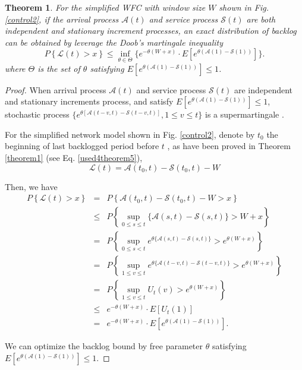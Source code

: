 \documentclass[12pt]{article}
\newtheorem{theorem}{Theorem}
\newtheorem{proof}{Proof}
\begin{document}
\begin{theorem}\label{theorem3}
For the simplified WFC with window size $W$ shown in Fig. \ref{control2}, if the arrival process $\mathcal{A}(t)$ and service process $\mathcal{S}(t)$ are both independent and stationary increment processes, an exact distribution of backlog can be obtained by leverage the Doob's martingale inequality
\begin{equation}\label{eqn3}
P\left\{\mathcal{L}(t)>x\right\}\leq \inf_{\theta\in\Theta}\{e^{-\theta(W+x)}\cdot E[e^{\theta(\mathcal{A}(1)-\mathcal{S}(1))}]\}.
\end{equation}
where $\Theta$ is the set of $\theta$ satisfying $E[e^{\theta(\mathcal{A}(1)-\mathcal{S}(1))}]\leq 1$.
\end{theorem}
\begin{proof}
When arrival process $\mathcal{A}(t)$ and service process $\mathcal{S}(t)$ are independent and stationary increments process, and satisfy $E[e^{\theta(\mathcal{A}(1)-\mathcal{S}(1))}]\leq 1$, stochastic process $\{e^{\theta[\mathcal{A}(t-v,t)-\mathcal{S}(t-v,t)]},1\leq v\leq t\}$ is a supermartingale \cite{jiang2009network,Ciucu2007Network}.

For the simplified network model shown in Fig. \ref{control2}, denote by $t_{0}$ the beginning of last backlogged period before $t$ \cite{Fidl06}, as have been proved in Theorem \ref{theorem1} (see Eq. \ref{used4theorem5}),
$$\mathcal{L}(t)=\mathcal{A}(t_0,t)-\mathcal{S}(t_0,t)-W$$

Then, we have
\begin{eqnarray*}
P\left\{\mathcal{L}(t)>x\right\}  &=&P\left\{\mathcal{A}(t_{0},t)-\mathcal{S}(t_{0},t)-W>x\right\}\\
  &\leq& P\left\{\sup_{0\leq s\leq t}\{\mathcal{A}(s,t)-\mathcal{S}(s,t)\}>W+x\right\}\\
  &=& P\left\{\sup_{0\leq s< t}e^{\theta\{\mathcal{A}(s,t)-\mathcal{S}(s,t)\}}>e^{\theta(W+x)}\right\}\\
  &=& P\left\{\sup_{1\leq v\leq t}e^{\theta\{\mathcal{A}(t-v,t)-\mathcal{S}(t-v,t)\}}>e^{\theta(W+x)}\right\}\\
  &=& P\left\{\sup_{1\leq v\leq t}U_{t}(v)>e^{\theta(W+x)}\right\}\\
  &\leq& e^{-\theta(W+x)}\cdot E[U_{t}(1)]\\
  &=& e^{-\theta(W+x)}\cdot E[e^{\theta(\mathcal{A}(1)-\mathcal{S}(1))}].
\end{eqnarray*}

We can optimize the backlog bound by free parameter $\theta$ satisfying $E[e^{\theta(\mathcal{A}(1)-\mathcal{S}(1))}]\leq 1$.
\end{proof}
\end{document}
